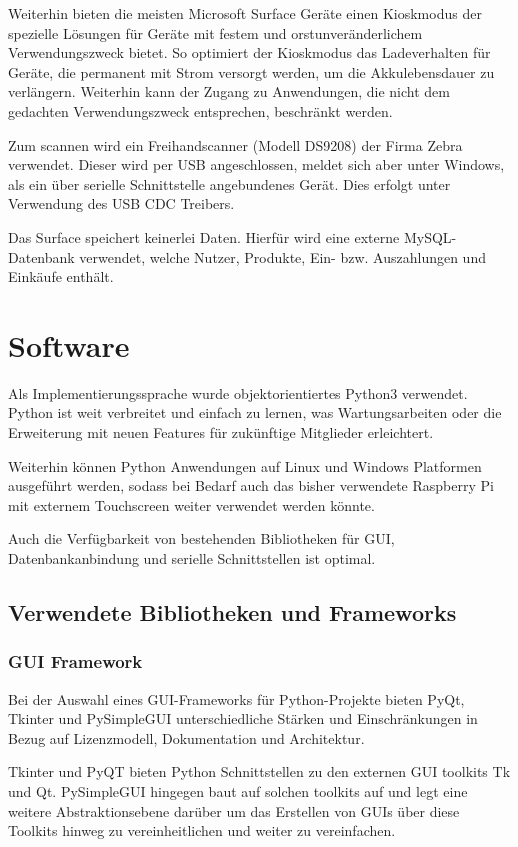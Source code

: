\documentclass[12pt]{article}
\begin{document}
Weiterhin bieten die meisten Microsoft Surface Geräte einen Kioskmodus der spezielle Lösungen für Geräte mit festem und orstunveränderlichem Verwendungszweck bietet.
So optimiert der Kioskmodus das Ladeverhalten für Geräte, die permanent mit Strom versorgt werden, um die Akkulebensdauer zu verlängern.
Weiterhin kann der Zugang zu Anwendungen, die nicht dem gedachten Verwendungszweck entsprechen, beschränkt werden.

Zum scannen wird ein Freihandscanner (Modell DS9208) der Firma Zebra verwendet. Dieser wird per USB angeschlossen, meldet sich aber unter Windows, als ein über serielle Schnittstelle angebundenes Gerät.
Dies erfolgt unter Verwendung des \ac{USB CDC} Treibers.

Das Surface speichert keinerlei Daten. Hierfür wird eine externe MySQL-Datenbank verwendet, welche Nutzer, Produkte, Ein- bzw. Auszahlungen und Einkäufe enthält.

\section{Software}
Als Implementierungssprache wurde objektorientiertes Python3 verwendet. Python ist weit verbreitet und einfach zu lernen, was Wartungsarbeiten oder die Erweiterung mit neuen Features für zukünftige Mitglieder erleichtert. 

Weiterhin können Python Anwendungen auf Linux und Windows Platformen ausgeführt werden, sodass bei Bedarf auch das bisher verwendete Raspberry Pi mit externem Touchscreen weiter verwendet werden könnte. 

Auch die Verfügbarkeit von bestehenden Bibliotheken für \ac{GUI}, Datenbankanbindung und serielle Schnittstellen ist optimal.

\subsection{Verwendete Bibliotheken und Frameworks}

\subsubsection{\ac{GUI} Framework}

Bei der Auswahl eines GUI-Frameworks für Python-Projekte bieten PyQt, Tkinter und PySimpleGUI unterschiedliche Stärken und Einschränkungen in Bezug auf Lizenzmodell, Dokumentation und Architektur. 

Tkinter und PyQT bieten Python Schnittstellen zu den externen GUI toolkits Tk und Qt. PySimpleGUI hingegen baut auf solchen toolkits auf und legt eine weitere Abstraktionsebene darüber um das Erstellen von GUIs über diese Toolkits hinweg zu vereinheitlichen und weiter zu vereinfachen.
\end{document}
